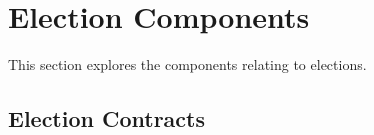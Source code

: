 \section{Election Components}

This section explores the components relating to elections.
% 




\subsection{Election Contracts}



%
